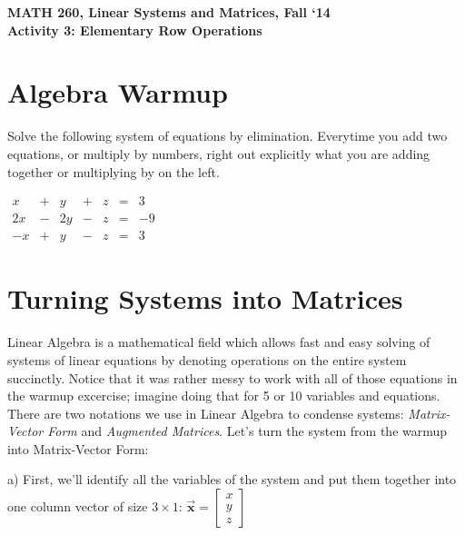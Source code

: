 \documentclass{article}
\begin{document}
\begin{flushleft}
	\bfseries{MATH 260, Linear Systems and Matrices, Fall `14}\\
	\bfseries{Activity 3:  Elementary Row Operations}\\
\end{flushleft}
\begin{flushleft}

\section*{Algebra Warmup}
Solve the following system of equations by elimination. Everytime you add two equations, or multiply by numbers, right out explicitly what you are adding together or multiplying by on the left.

\vspace{0.25in}

\begin{center}
$\begin{array}{rrrrrcr}
x&+&y&+&z&=&3\\
2x&-&2y&-&z&=&-9\\
-x&+&y&-&z&=&3
\end{array}
$
\end{center}

\newpage

\section{Turning Systems into Matrices}

Linear Algebra is a mathematical field which allows fast and easy solving of systems of linear equations by denoting operations on the entire system succinctly.  Notice that it was rather messy to work with all of those equations in the warmup excercise; imagine doing that for 5 or 10 variables and equations. There are two notations we use in Linear Algebra to condense systems: \textit{Matrix-Vector Form} and \textit{Augmented Matrices}. Let's turn the system from the warmup into Matrix-Vector Form:

\vspace{0.2in}

a) First, we'll identify all the variables of the system and put them together into one column vector of size $3 \times 1$: $\vec{\textbf{x}}=\begin{bmatrix} x\\y\\z\end{bmatrix}$


\end{flushleft}
\end{document}
